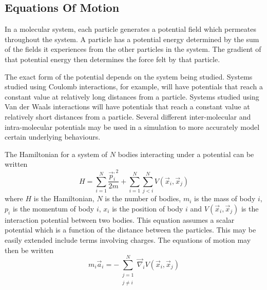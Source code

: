 \subsection{Equations Of Motion}

%
In a molecular system, each particle generates a potential field
which permeates throughout the system.
%
A particle has a potential energy determined by the sum
of the fields it experiences from the other particles in the system.
%
The gradient of that potential energy then determines
the force felt by that particle.

%
The exact form of the potential depends on the system being studied.
%
Systems studied using Coulomb interactions, for example,
will have potentials that reach a constant value at relatively long distances
from a particle.
%
Systems studied using Van der Waals interactions will have
potentials that reach a constant value at relatively short distances from
a particle.
%
Several different inter-molecular and intra-molecular potentials may be used
in a simulation to more accurately model certain underlying behaviours.


%
The Hamiltonian for a system of $N$ bodies
interacting under a \twobody{} potential can be written
\begin{equation}
    H = \sum_{i=1}^N \frac{\vec{p}_i^{,2}}{2 m}
        + \sum_{i=1}^N \sum_{j<i}^N V(\vec{x}_i, \vec{x}_j)
\end  {equation}
where $H$ is the Hamiltonian,
$N$ is the number of bodies,
$m_i$ is the mass of body $i$,
$p_i$ is the momentum of body $i$,
$x_i$ is the position of body $i$ and
$V(\vec{x}_i, \vec{x}_j)$ is the \twobody{} interaction potential
between two bodies.
%
This equation assumes a scalar potential which is
a function of the distance between the particles.
%
This may be easily extended include terms involving charges.
%
The equations of motion may then be written
\begin{equation}
    m_i \vec{a}_i = -\sum_{\substack{j=1\\j\ne{}i}}^N
                    \vec{\nabla}_i V(\vec{x}_i, \vec{x}_j)
\end  {equation}


